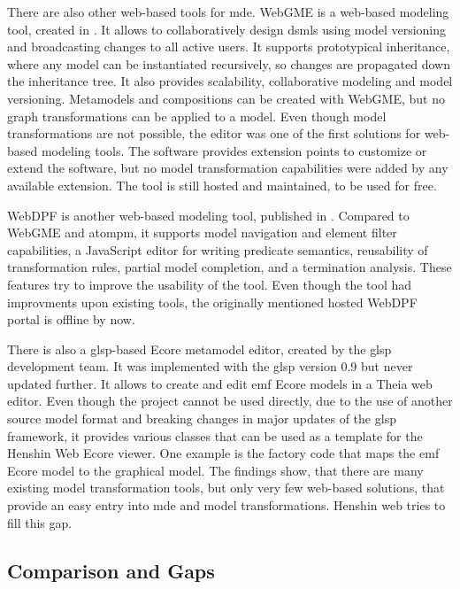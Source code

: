   There are also other web-based tools for \ac{mde}. WebGME \cite{webGME} is a web-based modeling tool, created in \citeyear{webGME}. It allows to collaboratively design \acp{dsml} using model versioning and broadcasting changes to all active users. It supports prototypical inheritance, where any model can be instantiated recursively, so changes are propagated down the inheritance tree. It also provides scalability, collaborative modeling and model versioning. Metamodels and compositions can be created with WebGME, but no graph transformations can be applied to a model. Even though model transformations are not possible, the editor was one of  the first solutions for web-based modeling tools. \cite{webGME} The software provides extension points to customize or extend the software, but no model transformation capabilities were added by any available extension. \cite{webgme-website} The tool is still hosted and maintained, to be used for free. \cite{webgme-website}


  WebDPF \cite{webDPF} is another web-based modeling tool, published in \citeyear{webDPF}. Compared to WebGME and \ac{atompm}, it supports model navigation and element filter capabilities, a JavaScript editor for writing predicate semantics, reusability of transformation rules, partial model completion, and a termination analysis. These features try to improve the usability of the tool. \cite{webDPF} Even though the tool had improvments upon existing tools, the originally mentioned hosted WebDPF portal is offline by now. 


  There is also a \ac{glsp}-based Ecore metamodel editor, created by the \ac{glsp} development team. It was implemented with the \ac{glsp} version 0.9 but never updated further. It allows to create and edit \ac{emf} Ecore models in a Theia web editor. Even though the project cannot be used directly, due to the use of another source model format and breaking changes in major updates of the \ac{glsp} framework, it provides various classes that can be used as a template for the Henshin Web Ecore viewer. One example is the factory code that maps the \ac{emf} Ecore model to the graphical model. \cite{glsp-ecore-repo}
  The findings show, that there are many existing model transformation tools, but only very few web-based solutions, that provide an easy entry into \ac{mde} and model transformations. Henshin web tries to fill this gap.

  \subsection{Comparison and Gaps}
  \label{subsec:related-comparison}